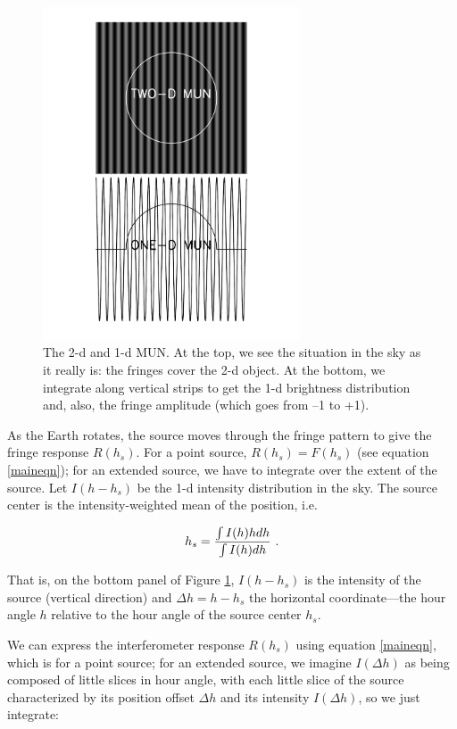 \documentclass[11pt,preprint]{aastex}
\begin{document}
\begin{figure}[h!]
\begin{center}
\includegraphics[width=3.0in] {plots/interf_fig.pdf}
\end{center}
                                                                                
\caption{\footnotesize The 2-d and 1-d MUN. At the top, we see the
  situation in the sky as it really is: the fringes cover the 2-d
  object.  At the bottom, we integrate along vertical strips to get the
  1-d brightness distribution and, also, the fringe amplitude (which
  goes from --1 to +1).
\label{interf_fig} } \end{figure}

As the Earth rotates, the source moves through the fringe pattern to
give the fringe response $R(h_s)$. For a point source, $R(h_s)= F(h_s)$
(see equation \ref{maineqn}); for an extended source, we have to
integrate over the extent of the source.  Let $I(h - h_s)$ be the 1-d
intensity distribution in the sky. 
The source center is the intensity-weighted mean of the
position, i.e.

\begin{equation}
h_s = { \int I(h)h dh \over \int I(h) dh} \ .
\end{equation}

\noindent That is, on the bottom panel of
Figure \ref{interf_fig}, $I(h - h_s)$ is the intensity of the source (vertical
direction) and $\Delta h= h -h_s$ the horizontal coordinate---the hour
angle $h$ relative to the hour angle of the source center $h_s$. 


We can express the interferometer response $R(h_s)$ using equation
\ref{maineqn}, which is for a point source; for an extended source, we
imagine $I(\Delta h)$ as being composed of little slices in hour angle,
with each little slice of the source characterized by its position
offset $\Delta h$ and its intensity $I(\Delta h)$, so we just integrate:
\end{document}
